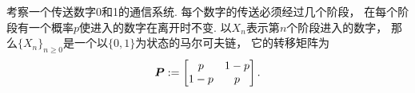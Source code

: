 \begin{example}[通信系统]
考察一个传送数字0和1的通信系统.
每个数字的传送必须经过几个阶段，
在每个阶段有一个概率\(p\)使进入的数字在离开时不变.
以\(X_n\)表示第\(n\)个阶段进入的数字，
那么\(\{X_n\}_{n\geq0}\)是一个以\(\{0,1\}\)为状态的马尔可夫链，
它的转移矩阵为\begin{equation*}
	\boldsymbol{P} := \begin{bmatrix}
		p & 1-p \\
		1-p & p
	\end{bmatrix}.
\end{equation*}
\end{example}
